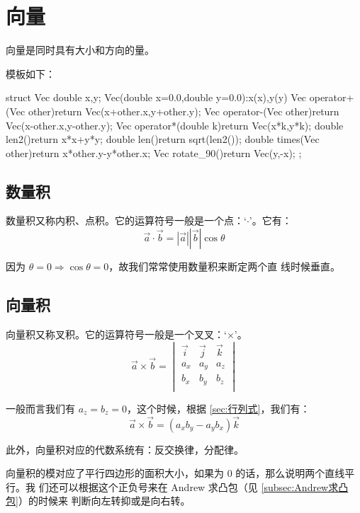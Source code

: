 \section{向量}
向量是同时具有大小和方向的量。

模板如下：
\begin{Cpp}
struct Vec{
  double x,y;
  Vec(double x=0.0,double y=0.0):x(x),y(y){}
  Vec operator+(Vec other){return Vec(x+other.x,y+other.y);}
  Vec operator-(Vec other){return Vec(x-other.x,y-other.y);}
  Vec operator*(double k){return Vec(x*k,y*k);}
  double len2(){return x*x+y*y;}
  double len(){return sqrt(len2());}
  double times(Vec other){return x*other.y-y*other.x;}
  Vec rotate_90(){return Vec(y,-x);}
};
\end{Cpp}

\subsection{数量积} \label{subsec:向量数量积}
数量积又称内积、点积。它的运算符号一般是一个点：`$\cdot$'。它有：
$$
    \vec a \cdot \vec b = |\vec a| |\vec b| \cos \theta
$$

因为 $\theta = 0 \Rightarrow \cos \theta = 0$，故我们常常使用数量积来断定两个直
线时候垂直。

\subsection{向量积} \label{subsec:向量向量积}
向量积又称叉积。它的运算符号一般是一个叉叉：`$\times$'。
$$
    \vec a \times \vec b = \begin{vmatrix}
        \vec i & \vec j & \vec k \\
        a_x    & a_y    & a_z    \\
        b_x    & b_y    & b_z    \\
    \end{vmatrix}
$$

一般而言我们有 $a_z = b_z = 0$，这个时候，根据 \ref{sec:行列式}，我们有：
$$
    \vec a \times \vec b = (a_x b_y - a_y b_x) \vec k
$$

此外，向量积对应的代数系统有：反交换律，分配律。

向量积的模对应了平行四边形的面积大小，如果为 $0$ 的话，那么说明两个直线平行。我
们还可以根据这个正负号来在 Andrew 求凸包（见 \ref{subsec:Andrew求凸包}）的时候来
判断向左转抑或是向右转。


